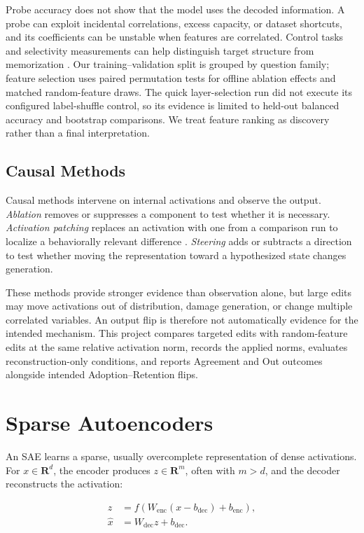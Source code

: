 Probe accuracy does not show that the model uses the decoded information. A probe can exploit incidental correlations, excess capacity, or dataset shortcuts, and its coefficients can be unstable when features are correlated. Control tasks and selectivity measurements can help distinguish target structure from memorization \cite{hewitt2019control}. Our training--validation split is grouped by question family; feature selection uses paired permutation tests for offline ablation effects and matched random-feature draws. The quick layer-selection run did not execute its configured label-shuffle control, so its evidence is limited to held-out balanced accuracy and bootstrap comparisons. We treat feature ranking as discovery rather than a final interpretation.

\subsection{Causal Methods}

Causal methods intervene on internal activations and observe the output. \emph{Ablation} removes or suppresses a component to test whether it is necessary. \emph{Activation patching} replaces an activation with one from a comparison run to localize a behaviorally relevant difference \cite{heimersheim2024patching}. \emph{Steering} adds or subtracts a direction to test whether moving the representation toward a hypothesized state changes generation.

These methods provide stronger evidence than observation alone, but large edits may move activations out of distribution, damage generation, or change multiple correlated variables. An output flip is therefore not automatically evidence for the intended mechanism. This project compares targeted edits with random-feature edits at the same relative activation norm, records the applied norms, evaluates reconstruction-only conditions, and reports Agreement and Out outcomes alongside intended Adoption--Retention flips.

\section{Sparse Autoencoders}

An SAE learns a sparse, usually overcomplete representation of dense activations. For $x\in\mathbf{R}^{d}$, the encoder produces $z\in\mathbf{R}^{m}$, often with $m>d$, and the decoder reconstructs the activation:

\begin{align}
z &= f\!\left(W_{\mathrm{enc}}(x-b_{\mathrm{dec}})+b_{\mathrm{enc}}\right), \\
\hat{x} &= W_{\mathrm{dec}}z+b_{\mathrm{dec}}.
\end{align}

